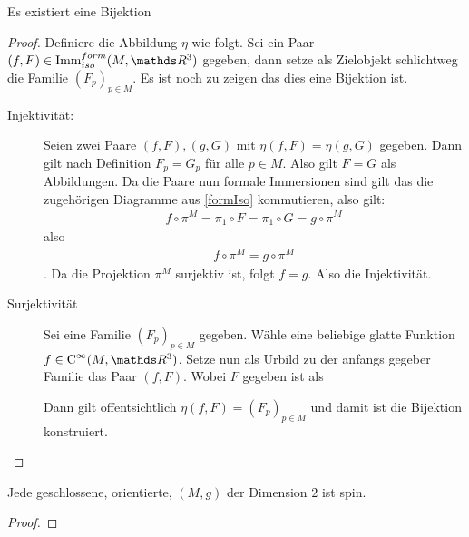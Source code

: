 \begin{Lem}
	Es existiert eine Bijektion
	
	\begin{proof}
		Definiere die Abbildung $ \eta $ wie folgt. Sei ein Paar $ (f,F) \in \Immfi{M}{\R^3}$ gegeben, dann setze als Zielobjekt
		schlichtweg die Familie $ (F_p)_{p\in M} $. Es ist noch
		zu zeigen das dies eine Bijektion ist.
		\begin{description}
			\item[Injektivität:] Seien zwei Paare $ (f,F),(g,G) $ 
			mit $ \eta(f,F)=\eta(g,G) $ gegeben. Dann gilt nach
			Definition $ F_p = G_p $ für alle $ p\in M $. Also
			gilt $ F=G $ als Abbildungen. Da die Paare nun formale
			Immersionen sind gilt das die zugehörigen Diagramme aus
			 \cref{formIso} kommutieren, also gilt:
			 \begin{gather*}
			 	f \circ \pi^M = \pi_1 \circ F = \pi_1 \circ G = g \circ \pi^M
			 \end{gather*}
			 also
			 \begin{gather*}
			 	f \circ \pi^M = g \circ \pi^M
			 \end{gather*}.
			 Da die Projektion $ \pi^M $ surjektiv ist, folgt $ f=g $.
			 Also die Injektivität.
			 \item[Surjektivität] Sei eine Familie $ (F_p)_{p\in M} $
			 gegeben. Wähle eine beliebige glatte Funktion $ f\in \Cinfty{M}{\R^3} $. Setze nun als Urbild zu der anfangs
			 gegeber Familie das Paar $ (f,F) $. Wobei $ F $
			 gegeben ist als 
			 
			 Dann gilt offentsichtlich $ \eta(f,F)=(F_p)_{p\in M} $
			 und damit ist die Bijektion konstruiert.
		\end{description}
	\end{proof}
\end{Lem}


\begin{Satz}
	Jede geschlossene, orientierte, \RMF  $(M,g)$ der Dimension $2$ ist spin.
	\begin{proof}
	\end{proof}
\end{Satz}

